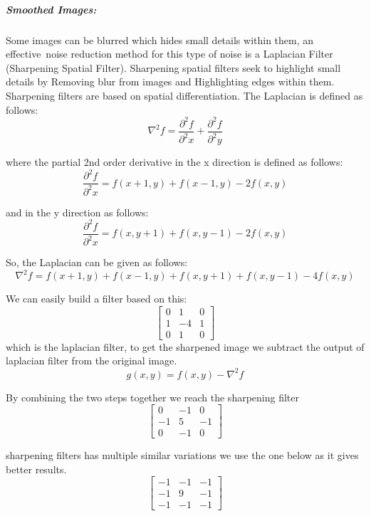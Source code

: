 \subparagraph{Smoothed Images:}
Some images can be blurred which hides small details within them, an effective noise reduction method for this type of noise is a Laplacian Filter (Sharpening Spatial Filter).\newline
Sharpening spatial filters seek to highlight small details by Removing blur from images and Highlighting edges within them.\newline
Sharpening filters are based on spatial differentiation.\newline
The Laplacian is defined as follows:
\[\nabla^{2} f = \frac{\partial^{2}f}{\partial^{2}x} + \frac{\partial^{2}f}{\partial^{2}y}\]

where the partial 2nd order derivative in the x direction is defined as follows:
\[\frac{\partial^{2}f}{\partial^{2}x} = f(x+1, y) + f(x-1, y) - 2f(x, y)\]

and in the y direction as follows:
\[\frac{\partial^{2}f}{\partial^{2}x} = f(x, y+1) + f(x, y-1) - 2f(x, y)\]

So, the Laplacian can be given as follows:
\[\nabla^{2} f = f(x+1, y) + f(x-1, y) + f(x, y+1) + f(x, y-1) - 4f(x, y)\]

We can easily build a filter based on this:
\[
\begin{bmatrix}
0 & 1 & 0 \\
1 & -4 & 1 \\
0 & 1 & 0
\end{bmatrix} \]
which is the laplacian filter, to get the sharpened image we subtract the output of laplacian filter from the original image.
\[g(x, y) = f(x, y) - \nabla^{2} f\]

By combining the two steps together we reach the sharpening filter
\[
\begin{bmatrix}
0 & -1 & 0 \\
-1 & 5 & -1 \\
0 & -1 & 0
\end{bmatrix} \]

sharpening filters has multiple similar variations we use the one below as it gives better results.
\[
\begin{bmatrix}
-1 & -1 & -1 \\
-1 & 9 & -1 \\
-1 & -1 & -1
\end{bmatrix} \]

